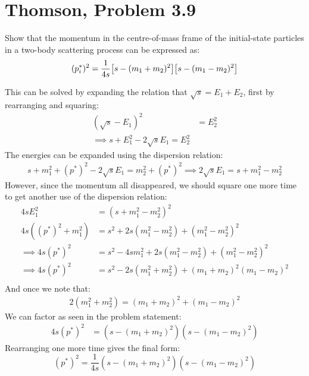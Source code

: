 \documentclass[12pt]{article}
\begin{document}
\section{Thomson, Problem 3.9}
\begin{problem}
  Show that the momentum in the centre-of-mass frame of the initial-state particles in a two-body scattering process can be expressed as:
  \begin{equation*}
    (p_i^*)^2=\frac1{4s}\qty[s-(m_1+m_2)^2]\qty[s-(m_1-m_2)^2]
  \end{equation*}
\end{problem}
This can be solved by expanding the relation that $\sqrt{s}=E_1+E_2$, first by rearranging and squaring:
\begin{align*}
  (\sqrt{s}-E_1)^2&=E_2^2\\
  \implies s+E_1^2-2\sqrt{s}E_1=E_2^2
\end{align*}
The energies can be expanded using the dispersion relation:
\begin{align*}
  s+m_1^2+(p^*)^2-2\sqrt{s}E_1=m_2^2+(p^*)^2
  \implies 2\sqrt{s}E_1=s+m_1^2-m_2^2
\end{align*}
However, since the momentum all disappeared, we should square one more time to get another use of the dispersion relation:
\begin{align*}
  4sE_1^2&=(s+m_1^2-m_2^2)^2\\
  4s((p^*)^2+m_1^2)&=s^2+2s(m_1^2-m_2^2)+(m_1^2-m_2^2)^2\\
  \implies 4s(p^*)^2&=s^2-4sm_1^2+2s(m_1^2-m_2^2)+(m_1^2-m_2^2)^2\\
  \implies 4s(p^*)^2&=s^2-2s(m_1^2+m_2^2)+(m_1+m_2)^2(m_1-m_2)^2\\
\end{align*}
And once we note that:
\begin{align*}
  2(m_1^2+m_2^2)=(m_1+m_2)^2+(m_1-m_2)^2
\end{align*}
We can factor as seen in the problem statement:
\begin{align*}
  4s(p^*)^2&=(s-(m_1+m_2)^2)(s-(m_1-m_2)^2)
\end{align*}
Rearranging one more time gives the final form:
\begin{equation}
  \label{eq:p5}
  \boxed{(p^*)^2=\frac1{4s}(s-(m_1+m_2)^2)(s-(m_1-m_2)^2)}
\end{equation}
\end{document}
